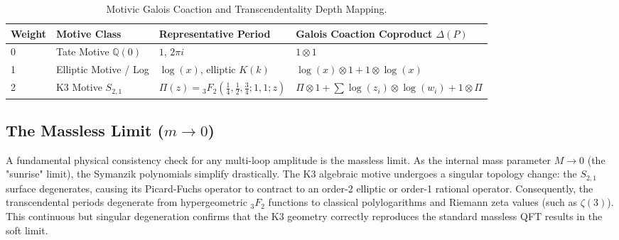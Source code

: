 \documentclass[11pt,a4paper]{article}
\begin{document}
\begin{table}[htbp]
\centering
\caption{Motivic Galois Coaction and Transcendentality Depth Mapping.}
\label{tab:coaction}
\begin{tabular}{llll}
\toprule
\textbf{Weight} & \textbf{Motive Class} & \textbf{Representative Period} & \textbf{Galois Coaction Coproduct $\Delta(P)$} \\
\midrule
0 & Tate Motive $\mathbb{Q}(0)$ & $1$, $2\pi i$ & $1 \otimes 1$ \\
1 & Elliptic Motive / Log & $\log(x)$, elliptic $K(k)$ & $\log(x) \otimes 1 + 1 \otimes \log(x)$ \\
2 & K3 Motive $S_{2,1}$ & $\Pi(z) = {}_3F_2(\frac{1}{4}, \frac{1}{2}, \frac{3}{4}; 1, 1; z)$ & $\Pi \otimes 1 + \sum \log(z_i) \otimes \log(w_i) + 1 \otimes \Pi$ \\
\bottomrule
\end{tabular}
\end{table}

\subsection{The Massless Limit ($m \to 0$)}
A fundamental physical consistency check for any multi-loop amplitude is the massless limit. As the internal mass parameter $M \to 0$ (the "sunrise" limit), the Symanzik polynomials simplify drastically. The K3 algebraic motive undergoes a singular topology change: the $S_{2,1}$ surface degenerates, causing its Picard-Fuchs operator to contract to an order-2 elliptic or order-1 rational operator. 
Consequently, the transcendental periods degenerate from hypergeometric ${}_3F_2$ functions to classical polylogarithms and Riemann zeta values (such as $\zeta(3)$). This continuous but singular degeneration confirms that the K3 geometry correctly reproduces the standard massless QFT results in the soft limit.
\end{document}

